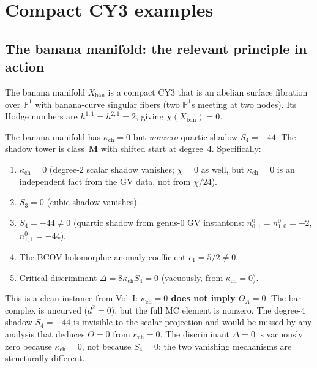 \documentclass[11pt]{article}
\newcommand{\bP}{\mathbb{P}}
\begin{document}
\section{Compact CY3 examples}
\label{sec:compact-cy3}

\subsection{The banana manifold: the relevant principle in action}
\label{subsec:banana}

The banana manifold $X_{\mathrm{ban}}$ is a compact CY3 that is an
abelian surface fibration over $\bP^1$ with banana-curve singular fibers
(two $\bP^1$s meeting at two nodes). Its Hodge numbers are
$h^{1,1} = h^{2,1} = 2$, giving $\chi(X_{\mathrm{ban}}) = 0$.

\begin{proposition}
\label{wn:prop:banana-shadow}
The banana manifold has $\kappa_{\mathrm{ch}} = 0$ but \emph{nonzero}
quartic shadow $S_4 = -44$. The shadow tower is class~$\mathbf{M}$
with shifted start at degree~$4$. Specifically:
\begin{enumerate}[label=\textup{(\roman*)}]
 \item $\kappa_{\mathrm{ch}} = 0$ \textup{(}degree-$2$ scalar shadow vanishes; $\chi = 0$ as well, but $\kappa_{\mathrm{ch}} = 0$ is an independent fact from the GV data, not from $\chi/24$\textup{)}.
 \item $S_3 = 0$ \textup{(}cubic shadow vanishes\textup{)}.
 \item $S_4 = -44 \neq 0$ \textup{(}quartic shadow from genus-$0$ GV instantons:
 $n^0_{0,1} = n^0_{1,0} = -2$, $n^0_{1,1} = -44$\textup{)}.
 \item The BCOV holomorphic anomaly coefficient $c_1 = 5/2 \neq 0$.
 \item Critical discriminant $\Delta = 8\kappa_{\mathrm{ch}} S_4 = 0$
 \textup{(}vacuously, from $\kappa_{\mathrm{ch}} = 0$\textup{)}.
\end{enumerate}
\end{proposition}

\begin{warning}[confirmation]
\label{warn:banana-ap31}
This is a clean instance from Vol~I:
\textbf{$\kappa_{\mathrm{ch}} = 0$ does not imply $\Theta_A = 0$}.
The bar complex is uncurved ($d^2 = 0$),
but the full MC element is nonzero.
The degree-$4$ shadow $S_4 = -44$ is invisible to the
scalar projection and would be missed by any analysis
that deduces $\Theta = 0$ from $\kappa_{\mathrm{ch}} = 0$.
The discriminant $\Delta = 0$ is vacuously zero because
$\kappa_{\mathrm{ch}} = 0$, not because $S_4 = 0$: the two
vanishing mechanisms are structurally different.
\end{warning}
\end{document}
